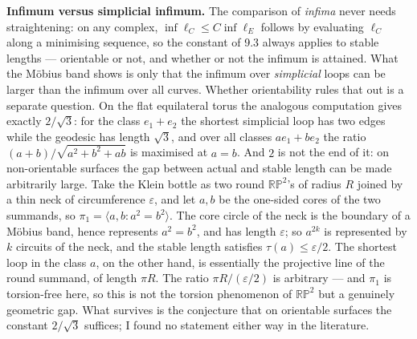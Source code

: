 \documentclass[
]{article}
\begin{document}
\textbf{Infimum versus simplicial infimum.} The comparison of
\emph{infima} never needs straightening: on any complex,
\(\inf\ell_C\le C\inf\ell_E\) follows by evaluating \(\ell_C\) along a
minimising sequence, so the constant of 9.3 always applies to stable
lengths --- orientable or not, and whether or not the infimum is
attained. What the M\"{o}bius band shows is only that the infimum over
\emph{simplicial} loops can be larger than the infimum over all curves.
Whether orientability rules that out is a separate question. On the flat
equilateral torus the analogous computation gives exactly \(2/\sqrt3\):
for the class \(e_1+e_2\) the shortest simplicial loop has two edges
while the geodesic has length \(\sqrt3\), and over all classes
\(a e_1+b e_2\) the ratio \((a+b)/\sqrt{a^2+b^2+ab}\) is maximised at
\(a=b\). And \(2\) is not the end of it: on non-orientable surfaces the
gap between actual and stable length can be made arbitrarily large. Take
the Klein bottle as two round \(\mathbb{RP}^2\)'s of radius \(R\) joined
by a thin neck of circumference \(\varepsilon\), and let \(a,b\) be the
one-sided cores of the two summands, so
\(\pi_1=\langle a,b:a^2=b^2\rangle\). The core circle of the neck is the
boundary of a M\"{o}bius band, hence represents \(a^2=b^2\), and has
length \(\varepsilon\); so \(a^{2k}\) is represented by \(k\) circuits
of the neck, and the stable length satisfies
\(\tau(a)\le\varepsilon/2\). The shortest loop in the class \(a\), on
the other hand, is essentially the projective line of the round summand,
of length \(\pi R\). The ratio \(\pi R/(\varepsilon/2)\) is arbitrary
--- and \(\pi_1\) is torsion-free here, so this is not the torsion
phenomenon of \(\mathbb{RP}^2\) but a genuinely geometric gap. What
survives is the conjecture that on orientable surfaces the constant
\(2/\sqrt3\) suffices; I found no statement either way in the
literature.
\end{document}
